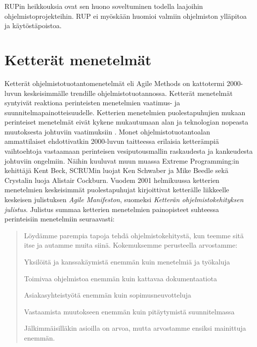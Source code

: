 \documentclass[finnish,12pt]{tktltiki2}
\theoremstyle{definition}
\theoremstyle{remark}
\begin{document}
RUPin heikkouksia ovat sen huono soveltuminen todella laajoihin ohjelmistoprojekteihin\cite{Ramsin:2008:PRO:1322432.1322435, Ruparelia:2010:SDL:1764810.1764814}. RUP ei myöskään huomioi valmiin ohjelmiston ylläpitoa ja käytöstäpoistoa\cite{Ramsin:2008:PRO:1322432.1322435}. 


\section{Ketterät menetelmät}

Ketterät ohjelmistotuotantomenetelmät eli Agile Methods on kattotermi 2000-luvun keskeisimmälle trendille ohjelmistotuotannossa. Ketterät menetelmät syntyivät reaktiona perinteisten menetelmien vaatimus- ja suunnitelmapainotteisuudelle. Ketterien menetelmien puolestapuhujien mukaan perinteiset menetelmät eivät kykene mukautumaan alan ja teknologian nopeasta muutoksesta johtuviin vaatimuksiin \cite{DBLP:journals/ac/CohenLC04}. Monet ohjelmistotuotantoalan ammattilaiset ehdottivatkin 2000-luvun taitteessa erilaisia ketterämpiä vaihtoehtoja vastaamaan perinteisen vesiputousmallin raskaudesta ja kankeudesta johtuviin ongelmiin. Näihin kuuluvat muun muassa Extreme Programming:in kehittäjä Kent Beck, SCRUMin luojat Ken Schwaber ja Mike Beedle sekä Crystalin luoja Alistair Cockburn\cite{Sommerville10,DBLP:journals/ac/CohenLC04}. Vuodem 2001 helmikuussa ketterien menetelmien keskeisimmät puolestapuhujat kirjoittivat ketterälle liikkeelle keskeisen julistuksen \textit{Agile Manifeston}, suomeksi \textit{Ketterän ohjelmistokehityksen julistus}. Julistus summaa ketterien menetelmien painopisteet suhteessa perinteisiin menetelmiin seuraavasti: 

\begin{quotation}
Löydämme parempia tapoja tehdä ohjelmistokehitystä, kun teemme sitä
itse ja autamme muita siinä. Kokemuksemme perusteella arvostamme:

\begin{description}
\item{Yksilöitä ja kanssakäymistä} enemmän kuin menetelmiä ja työkaluja
\item{Toimivaa ohjelmistoa} enemmän kuin kattavaa dokumentaatiota
\item{Asiakasyhteistyötä} enemmän kuin sopimusneuvotteluja
\item{Vastaamista muutokseen} enemmän kuin pitäytymistä suunnitelmassa
\end{description}

Jälkimmäisilläkin asioilla on arvoa, mutta
arvostamme ensiksi mainittuja enemmän. 
\end{quotation}
\end{document}
